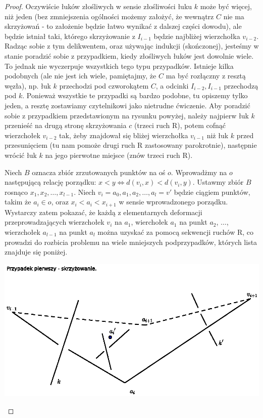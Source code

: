 \begin{proof}
Oczywiście łuków złośliwych w sensie złośliwości łuku $k$ może być więcej, niż jeden (bez zmniejszenia ogólności możemy założyć, że wewnątrz $C$ nie ma skrzyżowań - 
to założenie będzie łatwo wynikać z dalszej części dowodu), ale będzie istniał taki, którego skrzyżowanie z $I_{i-1}$ będzie najbliżej wierzchołka $v_{i-2}$.
Radząc sobie z tym delikwentem, oraz używając indukcji (skończonej), jesteśmy w stanie poradzić sobie z przypadkiem, kiedy złośliwych łuków jest dowolnie wiele. To jednak nie wyczerpuje
wszystkich tego typu przypadków. Istnieje kilka podobnych (ale nie jest ich wiele, pamiętajmy, że $C$ ma być rozłączny z resztą węzła), np. łuk $k$ przechodzi pod czworokątem $C$, a odcinki $I_{i-2}, I_{i-1}$ przechodzą pod $k$. 
Ponieważ wszystkie te przypadki są bardzo podobne, tu opiszemy tylko jeden, a resztę zostawiamy czytelnikowi jako nietrudne ćwiczenie.
Aby poradzić sobie z przypadkiem przedstawionym na rysunku powyżej, należy najpierw łuk $k$ przenieść na drugą stronę skrzyżowania $c$ (trzeci ruch R), potem cofnąć wierzchołek $v_{i-2}$
tak, żeby znajdował się bliżej wierzchołka $v_{i-1}$ niż łuk $k$ przed przesunięciem (tu nam pomoże drugi ruch R zastosowany parokrotnie), 
następnie wrócić łuk $k$ na jego pierwotne miejsce (znów trzeci ruch R).
 

Niech $B$ oznacza zbiór zrzutowanych punktów na oś $o$. Wprowadżmy na $o$ następującą relację porządku: $x < y\iff d(v_i,x) < d(v_i, y)$. Ustawmy zbiór $B$ rosnąco $x_1, x_2, \ldots, x_{l-1}$.
Niech $v_i = a_0, a_1, a_2, \ldots, a_l = v'$ będzie ciągiem punktów, takim że $a_i\in o$, oraz $x_i < a_i < x_{i+1}$ w sensie wprowadzonego porządku. 
Wystarczy zatem pokazać, że każdą z elementarnych deformacji przeprowadzających wierzchołek $v_i$ na $a_1$, wierchołek $a_1$ na punkt $a_2$, $\ldots$, 
wierzchołek $a_{l-1}$ na punkt $a_l$ można uzyskać za pomocą sekwencji ruchów R, co prowadzi do rozbicia problemu na wiele mniejszych podprzypadków, których lista znajduje się
poniżej.

\begin{minipage}{0.3\textwidth}
	\begin{center}

	\includegraphics[scale=0.8]{1/pictures/cross.eps}
	\end{center}
	\end{minipage}


\end{proof}
